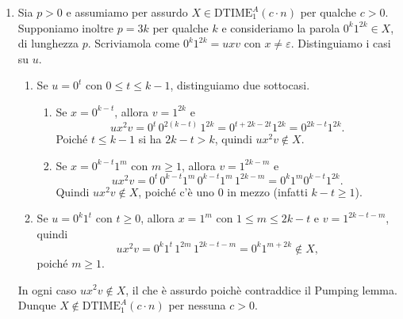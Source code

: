 \begin{sol}
\begin{enumerate}
Sia $w\in\{0,1\}^*$ con $|w|=n\ge 1$. Ogni giro completo
cancella $3$ simboli, quindi la macchina inizia al più $\lfloor n/3\rfloor+1$ giri
(l'ultimo può essere parziale, e dopo di esso la macchina si ferma). Poiché la
parola non si allunga mai, ogni giro costa al più $2n+1$ passi. Perciò
\[
T(n)\le\Bigl(\frac n3+1\Bigr)(2n+1)=\frac{2n^2+7n+3}{3}
\le \frac{2n^2+7n^2+3n^2}{3}=4n^2 \qquad (n\ge 1).
\]
Dunque $c=4$ vale per ogni input.
Abbiamo la tesi.

    \item Sia $p>0$ e assumiamo per assurdo $X\in\mathrm{DTIME}_1^A(c\cdot n)$ per qualche $c>0$. Supponiamo inoltre $p=3k$ per qualche $k$ e consideriamo la parola $0^k1^{2k}\in X$, di lunghezza $p$. Scriviamola come $0^k1^{2k}=uxv$ con $x\neq\varepsilon$. Distinguiamo i casi su $u$.
    \begin{enumerate}
        \item Se $u=0^t$ con $0\le t\le k-1$, distinguiamo due sottocasi.
        \begin{enumerate}
            \item Se $x=0^{k-t}$, allora $v=1^{2k}$ e
            \[
                ux^2v=0^t\,0^{2(k-t)}\,1^{2k}=0^{t+2k-2t}1^{2k}=0^{2k-t}1^{2k}.
            \]
            Poiché $t\le k-1$ si ha $2k-t>k$, quindi $ux^2v\notin X$.
            \item Se $x=0^{k-t}1^m$ con $m\ge 1$, allora $v=1^{2k-m}$ e
            \[
                ux^2v=0^t\,0^{k-t}1^m\,0^{k-t}1^m\,1^{2k-m}=0^k1^m0^{k-t}1^{2k}.
            \]
            Quindi $ux^2v\notin X$, poiché c'è uno $0$ in mezzo (infatti $k-t\ge 1$).
        \end{enumerate}
        \item Se $u=0^k1^t$ con $t\ge 0$, allora $x=1^m$ con $1\le m\le 2k-t$ e $v=1^{2k-t-m}$, quindi
        \[
            ux^2v=0^k1^t\,1^{2m}\,1^{2k-t-m}=0^k1^{m+2k}\notin X,
        \]
        poiché $m\ge 1$.
    \end{enumerate}
    In ogni caso $ux^2v\notin X$, il che è assurdo poichè contraddice il Pumping lemma. 
    Dunque $X\notin\mathrm{DTIME}_1^A(c\cdot n)$ per nessuna $c>0$.
\end{enumerate}
\end{sol}